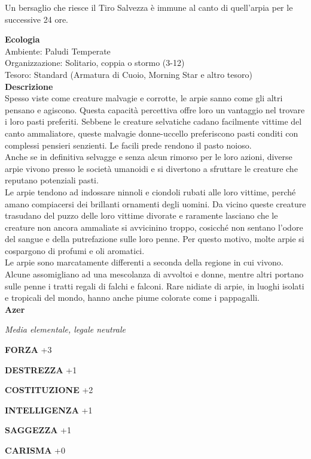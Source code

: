 \begin{multicols}{2}
Un bersaglio che riesce il Tiro Salvezza è immune al canto di quell'arpia per le successive 24 ore.

\textbf{Ecologia}\\
Ambiente: Paludi Temperate\\
Organizzazione: Solitario, coppia o stormo (3-12)\\
Tesoro: Standard (Armatura di Cuoio, Morning Star e altro tesoro)\\
\textbf{Descrizione}\\
Spesso viste come creature malvagie e corrotte, le arpie sanno come gli altri pensano e agiscono. Questa capacità percettiva offre loro un vantaggio nel trovare i loro pasti preferiti. Sebbene le creature selvatiche cadano facilmente vittime del canto ammaliatore, queste malvagie donne-uccello preferiscono pasti conditi con complessi pensieri senzienti. Le facili prede rendono il pasto noioso.\\
Anche se in definitiva selvagge e senza alcun rimorso per le loro azioni, diverse arpie vivono presso le società umanoidi e si divertono a sfruttare le creature che reputano potenziali pasti.\\
Le arpie tendono ad indossare ninnoli e ciondoli rubati alle loro vittime, perché amano compiacersi dei brillanti ornamenti degli uomini. Da vicino queste creature trasudano del puzzo delle loro vittime divorate e raramente lasciano che le creature non ancora ammaliate si avvicinino troppo, cosicché non sentano l'odore del sangue e della putrefazione sulle loro penne. Per questo motivo, molte arpie si cospargono di profumi e oli aromatici.\\
Le arpie sono marcatamente differenti a seconda della regione in cui vivono. Alcune assomigliano ad una mescolanza di avvoltoi e donne, mentre altri portano sulle penne i tratti regali di falchi e falconi. Rare nidiate di arpie, in luoghi isolati e tropicali del mondo, hanno anche piume colorate come i pappagalli.\\


\medskip{}\textbf{Azer}

\emph{Media elementale, legale neutrale}

\textbf{FORZA} +3

\textbf{DESTREZZA} +1

\textbf{COSTITUZIONE} +2

\textbf{INTELLIGENZA} +1

\textbf{SAGGEZZA} +1

\textbf{CARISMA} +0


\end{multicols}
